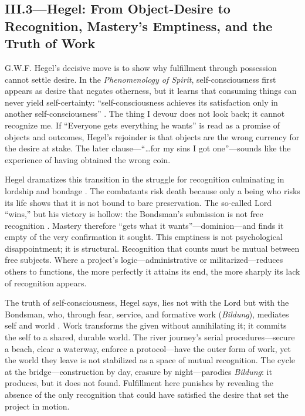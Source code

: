 \subsection*{III.3—Hegel: From Object-Desire to Recognition, Mastery's Emptiness, and the Truth of
	Work}
\label{ssec:iii-hegel}
G.W.F. Hegel's decisive move is to show why fulfillment through possession cannot settle
desire. In the \emph{Phenomenology of Spirit}, self-consciousness first appears as desire that
negates
otherness, but it learns that consuming things can never yield self-certainty:
``self-consciousness achieves its satisfaction only in another self-consciousness''
\parencite[\S 175]{HegelPhenomenology1977}. The thing I devour does not look back; it cannot
recognize me. If ``Everyone gets everything he wants'' is read as a promise of objects and
outcomes, Hegel's rejoinder is that objects are the wrong currency for the desire at stake.
The later clause—``\ldots for my sins I got one''—sounds like the experience of having obtained
the wrong coin.

Hegel dramatizes this transition in the struggle for recognition culminating in lordship and
bondage \parencite[\S\S 178--196]{HegelPhenomenology1977}. The combatants risk death because
only a being who risks its life shows that it is not bound to bare preservation. The so-called
Lord ``wins,'' but his victory is hollow: the Bondsman's submission is not free recognition
\parencite[\S\S 187--189]{HegelPhenomenology1977}. Mastery therefore ``gets what it
wants''—dominion—and
finds it empty of the very confirmation it sought. This emptiness is not psychological
disappointment; it is structural. Recognition that counts must be mutual between free subjects.
Where a project's logic—administrative or militarized—reduces others to functions, the more
perfectly it attains its end, the more sharply its lack of recognition appears.

The truth of self-consciousness, Hegel says, lies not with the Lord but with the Bondsman, who,
through fear, service, and formative work (\emph{Bildung}), mediates self and world
\parencite[\S 196]{HegelPhenomenology1977}. Work transforms the given without annihilating it;
it commits the self to a shared, durable world. The river journey's serial procedures—secure a
beach, clear a waterway, enforce a protocol—have the outer form of work, yet the world they
leave is not stabilized as a space of mutual recognition. The cycle at the bridge—construction
by day, erasure by night—parodies \emph{Bildung}: it produces, but it does not found.
Fulfillment here punishes by revealing the absence of the only recognition that could have
satisfied the desire that set the project in motion.

